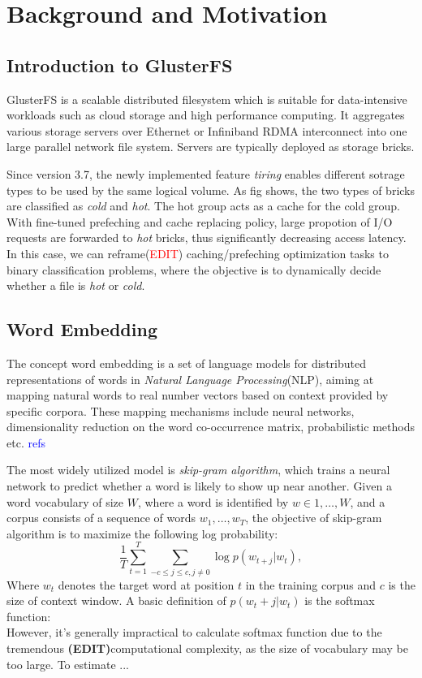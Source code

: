 \documentclass[conference]{IEEEtran}
\begin{document}
\section{Background and Motivation}
\subsection{Introduction to GlusterFS}
GlusterFS is a scalable distributed filesystem which is suitable for data-intensive workloads such as cloud storage and high performance computing.
It aggregates various storage servers over Ethernet or Infiniband RDMA interconnect into one large parallel network file system.
Servers are typically deployed as storage bricks.


Since version 3.7, the newly implemented feature \textit{tiring} enables different sotrage types to be used by the same logical volume.
As fig shows, the two types of bricks are classified as \textit{cold} and \textit{hot}. The hot group acts as a cache for the cold group. 
With fine-tuned prefeching and cache replacing policy, large propotion of I/O requests are forwarded to \textit{hot} bricks, thus significantly decreasing access latency.
In this case, we can reframe(\textcolor{red}{EDIT}) caching/prefeching optimization tasks to binary classification problems,
where the objective is to dynamically decide whether a file is \textit{hot} or \textit{cold}.

\subsection{Word Embedding}
The concept word embedding is a set of language models for distributed representations of words in \textit{Natural Language Processing}(NLP), 
aiming at mapping natural words to real number vectors based on context provided by specific corpora.
These mapping mechanisms include neural networks, dimensionality reduction on the word co-occurrence matrix, probabilistic methods etc. \textcolor{blue}{refs}


The most widely utilized model is \textit{skip-gram algorithm}\cite{SkipGram}, 
which trains a neural network to predict whether a word is likely to show up near another.
Given a word vocabulary of size $W$, where a word is identified by $w \in {1,\dots,W}$, 
and a corpus consists of a sequence of words $w_1, \dots, w_T$, the objective of skip-gram algorithm is to maximize the following log probability:
\begin{equation}
\frac{1}{T}\sum_{t=1}^{T}\sum_{-c \leq j \leq c,j \neq 0} \log p(w_{t+j} | w_t),
\end{equation}
Where $w_t$ denotes the target word at position $t$ in the training corpus and $c$ is the size of context window.
A basic definition of $p(w_t+j | w_t)$ is the softmax function:
\begin{equation}
\end{equation}
However, it's generally impractical to calculate softmax function due to the tremendous \textbf{(EDIT)}computational complexity,
as the size of vocabulary may be too large.
To estimate ...
\end{document}
